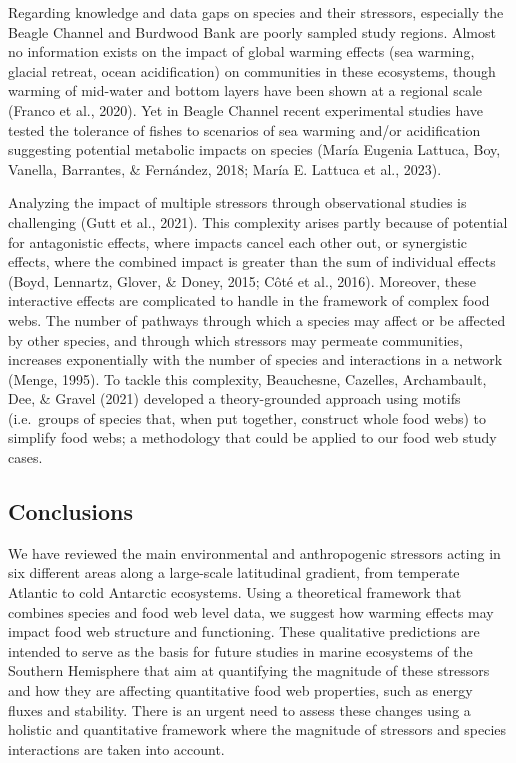 \documentclass[
]{article}
\begin{document}
Regarding knowledge and data gaps on species and their stressors,
especially the Beagle Channel and Burdwood Bank are poorly sampled study
regions. Almost no information exists on the impact of global warming
effects (sea warming, glacial retreat, ocean acidification) on
communities in these ecosystems, though warming of mid-water and bottom
layers have been shown at a regional scale (Franco et al., 2020). Yet in
Beagle Channel recent experimental studies have tested the tolerance of
fishes to scenarios of sea warming and/or acidification suggesting
potential metabolic impacts on species (María Eugenia Lattuca, Boy,
Vanella, Barrantes, \& Fernández, 2018; María E. Lattuca et al., 2023).

Analyzing the impact of multiple stressors through observational studies
is challenging (Gutt et al., 2021). This complexity arises partly
because of potential for antagonistic effects, where impacts cancel each
other out, or synergistic effects, where the combined impact is greater
than the sum of individual effects (Boyd, Lennartz, Glover, \& Doney,
2015; Côté et al., 2016). Moreover, these interactive effects are
complicated to handle in the framework of complex food webs. The number
of pathways through which a species may affect or be affected by other
species, and through which stressors may permeate communities, increases
exponentially with the number of species and interactions in a network
(Menge, 1995). To tackle this complexity, Beauchesne, Cazelles,
Archambault, Dee, \& Gravel (2021) developed a theory-grounded approach
using motifs (i.e.~groups of species that, when put together, construct
whole food webs) to simplify food webs; a methodology that could be
applied to our food web study cases.

\subsection{Conclusions}\label{conclusions}

We have reviewed the main environmental and anthropogenic stressors
acting in six different areas along a large-scale latitudinal gradient,
from temperate Atlantic to cold Antarctic ecosystems. Using a
theoretical framework that combines species and food web level data, we
suggest how warming effects may impact food web structure and
functioning. These qualitative predictions are intended to serve as the
basis for future studies in marine ecosystems of the Southern Hemisphere
that aim at quantifying the magnitude of these stressors and how they
are affecting quantitative food web properties, such as energy fluxes
and stability. There is an urgent need to assess these changes using a
holistic and quantitative framework where the magnitude of stressors and
species interactions are taken into account.
\end{document}
